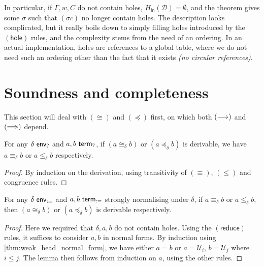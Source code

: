 \documentclass[twoside]{report}
\begin{document}
In particular, if $\Gamma, w, C$ do not contain holes, $H_{\mathsf{in}}(\mathcal D) = \emptyset$, and the theorem gives some $\sigma$ such that $(\sigma c)$ no longer contain holes. The description looks complicated, but it really boils down to simply filling holes introduced by the $(\mathsf{hole})$ rules, and the complexity stems from the need of an ordering. In an actual implementation, holes are references to a global table, where we do not need such an ordering other than the fact that it exists \emph{(no circular references)}.

\section{Soundness and completeness}
\label{sec:sequent_calculi_soundness_and_completeness}

This section will deal with $(\cong)$ and $(\preceq)$ first, on which both $(\longrightarrow)$ and $(\Longrightarrow)$ depend.

\begin{proposition}
    \label{thm:conversion_calculus_soundness}
    For any $\delta \ \mathsf{env}_{?}$ and $a, b \ \mathsf{term}_{?}$, if $(a \cong_\delta b)$ or $(a \preceq_\delta b)$ is derivable, we have $a \equiv_\delta b$ or $a \leq_\delta b$ respectively.
\end{proposition}

\begin{proof}
    By induction on the derivation, using transitivity of $(\equiv)$, $(\leq)$ and congruence rules.
\end{proof}

\begin{proposition}
    \label{thm:conversion_calculus_completeness}
    For any $\delta \ \mathsf{env}_{:=}$ and $a, b \ \mathsf{term}_{:=}$ strongly normalising under $\delta$, if $a \equiv_\delta b$ or $a \leq_\delta b$, then $(a \cong_\delta b)$ or $(a \preceq_\delta b)$ is derivable respectively.
\end{proposition}

\begin{proof}
    Here we required that $\delta, a, b$ do not contain holes. Using the $(\mathsf{reduce})$ rules, it suffices to consider $a, b$ in normal forms. By induction using \cref{thm:weak_head_normal_form}, we have either $a = b$ or $a = \mathcal U_i$, $b = \mathcal U_j$ where $i \leq j$. The lemma then follows from induction on $a$, using the other rules.
\end{proof}
\end{document}
